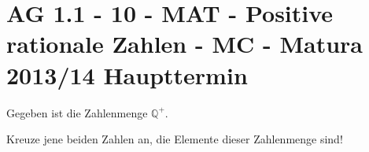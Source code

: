 \section{AG 1.1 - 10 - MAT - Positive rationale Zahlen - MC - Matura 2013/14 Haupttermin}

\begin{beispiel}[AG 1.1]{1} %
				Gegeben ist die Zahlenmenge $\mathbb{Q}^+$.
				
				Kreuze jene beiden Zahlen an, die Elemente dieser Zahlenmenge sind!\leer
				

\end{beispiel}